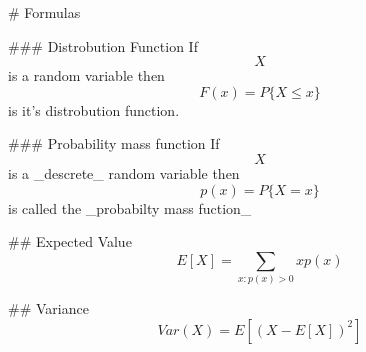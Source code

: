 # Formulas

### Distrobution Function
If \[X\] is a random variable then
\[F( x) = P\{ X \le x\}\] is it's distrobution function.

### Probability mass function
If \[X\] is a _descrete_ random variable then
\[p( x) = P\{ X = x\}\] is called the _probabilty mass fuction_

## Expected Value
\[E[ X] = \sum\limits_{x:p( x) > 0}{ x p( x)}\]


## Variance
\[Var( X) = E[ (X - E[ X])^2]\]
